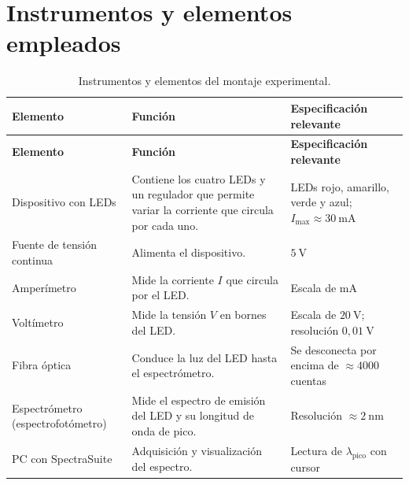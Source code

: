 \documentclass{article}
\begin{document}
\section{Instrumentos y elementos empleados}

\begin{longtable}{@{}L{4.0cm}L{6.8cm}L{5.4cm}@{}}
    \caption{Instrumentos y elementos del montaje experimental.}\label{tab:instrumentos}\\
    \toprule
    \textbf{Elemento} & \textbf{Función} & \textbf{Especificación relevante} \\
    \midrule
    \endfirsthead
    \toprule
    \textbf{Elemento} & \textbf{Función} & \textbf{Especificación relevante} \\
    \midrule
    \endhead
    \bottomrule
    \endfoot
    Dispositivo con LEDs & Contiene los cuatro LEDs y un regulador que permite variar la corriente que circula por cada uno. & LEDs rojo, amarillo, verde y azul; $I_{\max}\approx30\ \mathrm{mA}$ \\
    Fuente de tensión continua & Alimenta el dispositivo. & $5\ \mathrm{V}$ \\
    Amperímetro & Mide la corriente $I$ que circula por el LED. & Escala de mA \\
    Voltímetro & Mide la tensión $V$ en bornes del LED. & Escala de $20\ \mathrm{V}$; resolución $0,01\ \mathrm{V}$ \\
    Fibra óptica & Conduce la luz del LED hasta el espectrómetro. & Se desconecta por encima de $\approx4000$ cuentas \\
    Espectrómetro (espectrofotómetro) & Mide el espectro de emisión del LED y su longitud de onda de pico. & Resolución $\approx2\ \mathrm{nm}$ \\
    PC con SpectraSuite & Adquisición y visualización del espectro. & Lectura de $\lambda_{\mathrm{pico}}$ con cursor \\
\end{longtable}
\end{document}
